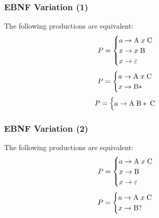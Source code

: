 \documentclass[aspectratio=169]{beamer}
\begin{document}
\begin{frame}
\frametitle{EBNF Variation (1)}

The following productions are equivalent:
\begin{align*}
P &= \begin{cases}a \rightarrow \text{\lstinline{A}} \; x \;
     \text{\lstinline{C}}\\
     x \rightarrow x \; \text{\lstinline{B}}\\
     x \rightarrow \varepsilon \end{cases}
\end{align*}
\begin{align*}
P &= \begin{cases}a \rightarrow \text{\lstinline{A}} \; x \;
     \text{\lstinline{C}}\\
     x \rightarrow \text{\lstinline{B}}* \end{cases}
\end{align*}
\begin{align*}
P &= \begin{cases}a \rightarrow \text{\lstinline{A}} \; \text{\lstinline{B}}* \;
     \text{\lstinline{C}}\end{cases}
\end{align*}
\end{frame}

\begin{frame}
\frametitle{EBNF Variation (2)}

The following productions are equivalent:
\begin{align*}
P &= \begin{cases}a \rightarrow \text{\lstinline{A}} \; x \;
     \text{\lstinline{C}}\\
     x \rightarrow \text{\lstinline{B}}\\
     x \rightarrow \varepsilon \end{cases}
\end{align*}
\begin{align*}
P &= \begin{cases}a \rightarrow \text{\lstinline{A}} \; x \;
     \text{\lstinline{C}}\\
     x \rightarrow \text{\lstinline{B}}? \end{cases}
\end{align*}
\end{frame}
\end{document}
